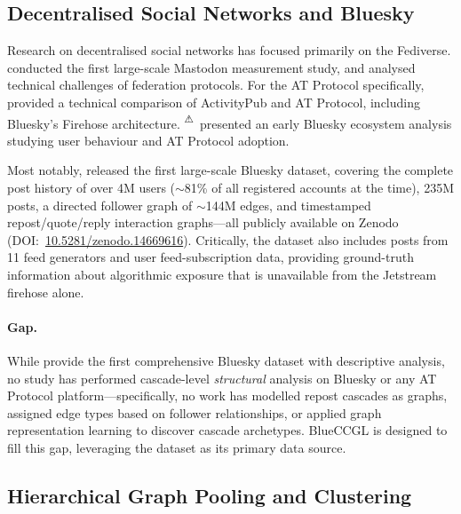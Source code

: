\documentclass[12pt,a4paper]{article}
\newcommand{\flagcite}[1]{%
  {\color{orange}\textsuperscript{⚠}}\,#1%
}
\begin{document}
\subsection{Decentralised Social Networks and Bluesky}

Research on decentralised social networks has focused primarily on the
Fediverse.  \citet{zignani2018mastodon} conducted the first large-scale
Mastodon measurement study, and \citet{raman2019challenges} analysed technical
challenges of federation protocols.  For the AT Protocol specifically,
\citet{kleppmann2024atprotocol} provided a technical comparison of
ActivityPub and AT Protocol, including Bluesky's Firehose architecture.
\flagcite{\citet{cerisara2025bluesky}} presented an early Bluesky ecosystem
analysis studying user behaviour and AT Protocol adoption.

Most notably, \textbf{\citet{failla2024bluesky}} released the first
large-scale Bluesky dataset, covering the complete post history of over 4M
users ($\sim$81\% of all registered accounts at the time), 235M posts, a
directed follower graph of $\sim$144M edges, and timestamped
repost/quote/reply interaction graphs---all publicly available on Zenodo
(DOI:~\href{https://doi.org/10.5281/zenodo.14669616}{10.5281/zenodo.14669616}).
Critically, the dataset also includes posts from 11 feed generators and user
feed-subscription data, providing ground-truth information about algorithmic
exposure that is unavailable from the Jetstream firehose alone.

\paragraph{Gap.}
While \citet{failla2024bluesky} provide the first comprehensive Bluesky
dataset with descriptive analysis, no study has performed cascade-level
\emph{structural} analysis on Bluesky or any AT Protocol platform---specifically,
no work has modelled repost cascades as graphs, assigned edge types based on
follower relationships, or applied graph representation learning to discover
cascade archetypes.  BlueCCGL is designed to fill this gap, leveraging the
\citet{failla2024bluesky} dataset as its primary data source.

\subsection{Hierarchical Graph Pooling and Clustering}
\end{document}
